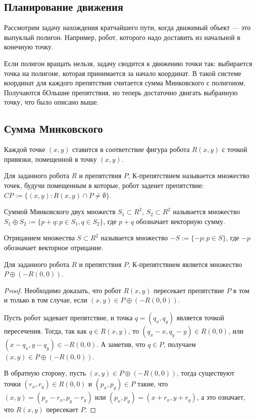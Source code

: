 \subsection{Планирование движения}

Рассмотрим задачу нахождения кратчайшего пути, когда движимый объект --- это выпуклый полигон.
Например, робот, которого надо доставить из начальной в конечную точку. 

Если полигон вращать нельзя, задачу сводится к движению точки так: выбирается точка на полигоне, которая принимается за начало координат.
В такой системе координат для каждого препятствия считается сумма Минковского с полигоном.
Получаются бОльшие препятствия, но теперь достаточно двигать выбранную точку, что было описано выше.

\subsection{Сумма Минковского}

Каждой точке $(x,y)$ ставится в соответствие фигура робота $R(x,y)$ с точкой привязки, помещенной в точку $(x,y)$.

\begin{definition}
    Для заданного робота $R$ и препятствия $P$, $К$-препятствием называется множество точек, будучи помещенным в которые, робот заденет препятствие: $CP:=\{(x,y):R(x,y) \cap P \not= \emptyset \}$.
\end{definition}

\begin{definition}
    Суммой Минковского двух множеств $S_1 \subset R^2$, $S_2 \subset R^2$ называется множество $S_1 \oplus S_2:=\{p+q:p \in S_1,q \in S_2\}$, где $p+q$ обозначает векторную сумму.
\end{definition}

\begin{definition}
    Отрицанием множества $S \subset R^2$ называется множество $-S:=\{-p:p \in S \}$, где $-p$ обозначает векторное отрицание.
\end{definition}

\begin{theorem}
    Для заданного робота $R$ и препятствия $P$, $К$-препятствием является множество $P \oplus (-R(0,0))$.
\end{theorem}
\begin{proof}
    Необходимо доказать, что робот $R(x,y)$ пересекает препятствие $P$ в том и только в том случае, если $(x,y) \in P \oplus (-R(0,0))$.
    
    Пусть робот задевает препятствие, и точка $q=(q_x,q_y)$ является точкой пересечения.
    Тогда, так как $q \in R(x,y)$, то $(q_x-x,q_y-y) \in R(0,0)$, или $(x-q_x,y-q_y) \in -R(0,0)$.
    А заметив, что $q \in P$, получаем $(x,y) \in P \oplus (-R(0,0))$.

    В обратную сторону, пусть $(x,y) \in P \oplus (-R(0,0))$, тогда существуют точки $(r_x,r_y) \in R(0,0)$ и $(p_x,p_y) \in P$ такие, что $(x,y)=(p_x-r_x,p_y-r_y)$ или $(p_x,p_y)=(x+r_x,y+r_y)$, а это означает, что $R(x,y)$ пересекает $P$. 
\end{proof}

